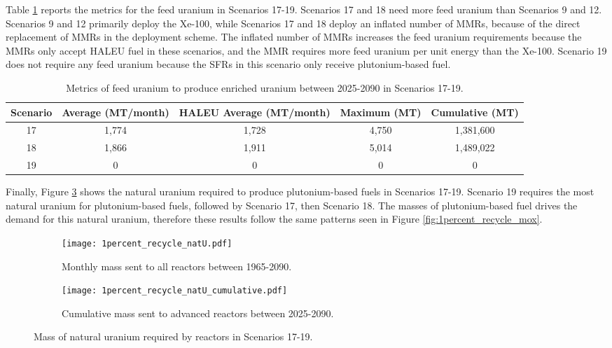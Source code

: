 Table \ref{tab:s17-19_feed} reports the metrics for the feed uranium in 
Scenarios 17-19. Scenarios 17 and 18 need more feed uranium than 
Scenarios 9 and 12. Scenarios 9 and 12 primarily deploy the Xe-100,
while Scenarios 17 and 18 deploy an inflated number of \glspl{MMR}, 
because of the direct replacement of \glspl{MMR} in the deployment 
scheme. The inflated number of \glspl{MMR} increases the 
feed uranium requirements because the \glspl{MMR} only accept 
\gls{HALEU} fuel in these scenarios, and the \gls{MMR} requires 
more feed uranium per unit energy than the Xe-100. Scenario 19 does not 
require any feed uranium because the \glspl{SFR} in this scenario 
only receive plutonium-based fuel. 

\begin{table}[h!]
    \centering 
    \caption{Metrics of feed uranium to produce enriched uranium 
    between 2025-2090 in Scenarios 17-19.}
    \label{tab:s17-19_feed}
    \begin{tabular}{c c c c c}
        \hline 
        Scenario & Average (MT/month) & HALEU Average (MT/month) & 
        Maximum (MT) & Cumulative (MT) \\
        \hline
        17 & 1,774 & 1,728 & 4,750 & 1,381,600\\
        18 & 1,866 & 1,911 & 5,014 & 1,489,022\\
        19 & 0 & 0 & 0 & 0\\
        \hline
    \end{tabular}
\end{table}

Finally, Figure \ref{fig:1percent_recycle_natU} shows the natural uranium 
required to produce plutonium-based fuels in Scenarios 17-19. Scenario 
19 requires the most natural uranium for plutonium-based fuels, 
followed by Scenario 17, then Scenario 18. The masses of plutonium-based 
fuel drives the demand for this natural uranium, therefore these 
results follow the same patterns seen in Figure \ref{fig:1percent_recycle_mox}.

\begin{figure}[h!]
    \centering
    \begin{subfigure}[b]{0.45\textwidth}
        \centering
        \texttt{[image: 1percent\_recycle\_natU.pdf]}
        \caption{Monthly mass sent to all reactors 
        between 1965-2090.}
        \label{fig:1percent_recycle_AR_natu}
    \end{subfigure}
    \hfill
    \begin{subfigure}[b]{0.45\textwidth}
        \centering
        \texttt{[image: 1percent\_recycle\_natU\_cumulative.pdf]}
        \caption{Cumulative mass  sent to 
        advanced reactors between 2025-2090.}
        \label{fig:1percent_recycle_natu_cumulative}
    \end{subfigure}
       \caption{Mass of natural uranium required by reactors
        in Scenarios 17-19.}
       \label{fig:1percent_recycle_natU}
\end{figure}

